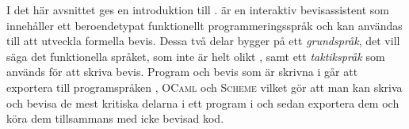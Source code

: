 I det här avsnittet ges en introduktion till \coq{}. \coq{} är en interaktiv
bevisassistent som innehåller ett beroendetypat funktionellt
programmeringsspråk och kan användas till att utveckla formella bevis. Dessa
två delar bygger på ett \emph{grundspråk}, det vill säga det funktionella
språket, som inte är helt olikt \haskell{}, samt ett \emph{taktikspråk} som
används för att skriva bevis. Program och bevis som är skrivna i \coq{} går att
exportera till programspråken \haskell{}, \textsc{OCaml} och \textsc{Scheme}
vilket gör att man kan skriva och bevisa de mest kritiska delarna i ett program
i \coq{} och sedan exportera dem och köra dem tillsammans med icke bevisad kod.
